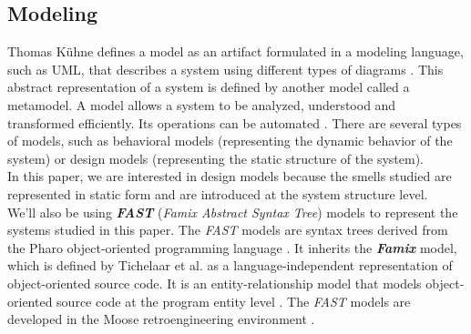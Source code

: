 


\subsection{Modeling}

Thomas Kühne defines a model as an artifact formulated in a modeling language, such as UML, that describes a system using different types of diagrams \cite{kuhne2006matters}. This abstract representation of a system is defined by another model called a metamodel. A model allows a system to be analyzed, understood and transformed efficiently. Its operations can be automated \cite{gonzalez2014formal}. There are several types of models, such as behavioral models (representing the dynamic behavior of the system) or design models (representing the static structure of the system).\\In this paper, we are interested in design models because the smells studied are represented in static form and are introduced at the system structure level.\\

We'll also be using \textbf{\emph{FAST}} (\emph{Famix Abstract Syntax Tree}) models to represent the systems studied in this paper. The \emph{FAST} models are syntax trees derived from the Pharo object-oriented programming language \cite{black2010pharo, bergel2013deep, zaitsev2020characterizing}. It inherits the \textbf{\emph{Famix}} model, which is defined by Tichelaar et al. as a language-independent representation of object-oriented source code. It is an entity-relationship model that models object-oriented source code at the program entity level \cite{891485} \cite{demeyer1999famix}. The \emph{FAST} models are developed in the Moose retroengineering environment \cite{ducasse2000moose}.\\\\



